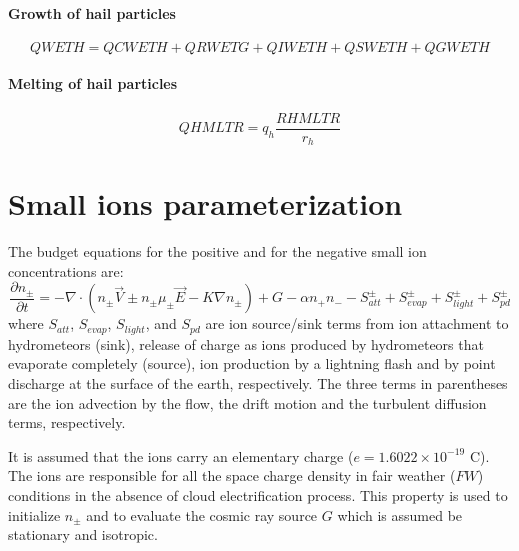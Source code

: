 \paragraph{Growth of hail particles}

\begin{equation}
  QWETH = QCWETH + QRWETG + QIWETH + QSWETH + QGWETH
\end{equation}


\paragraph{Melting of hail particles}

\begin{equation}
  QHMLTR = q_h \frac{RHMLTR}{r_h}
\end{equation}




\section{Small ions parameterization}

The budget equations for the positive and for the negative small ion concentrations are:
\begin{equation}\label{eq:ions}
  \frac{\partial n_{\pm}}{\partial t} = - \nabla \cdot (n_{\pm} \overrightarrow{V} \pm n_{\pm} \mu _{\pm} \overrightarrow{E} - K \nabla n_{\pm})
                                        + G - \alpha n_+ n_-
                                        - S^{\pm} _{att} + S^{\pm} _{evap} + S^{\pm} _{light} + S^{\pm} _{pd}
\end{equation}
where $S_{att}$, $S_{evap}$, $S_{light}$, and $S_{pd}$ are ion source/sink terms from ion attachment to hydrometeors (sink), release of charge as ions produced by hydrometeors that evaporate completely (source), ion production by a lightning flash and by point discharge at the surface of the earth, respectively.
The three terms in parentheses are the ion advection by the flow, the drift motion and the turbulent diffusion terms, respectively.

It is assumed that the ions carry an elementary charge ($e=1.6022\times10^{-19}$ C). The ions are responsible for all the space charge density in fair weather ($FW$) conditions in the absence of cloud electrification process. This property is used to initialize $n_{\pm}$ and to evaluate the cosmic ray source $G$ which is assumed be stationary and isotropic. 

